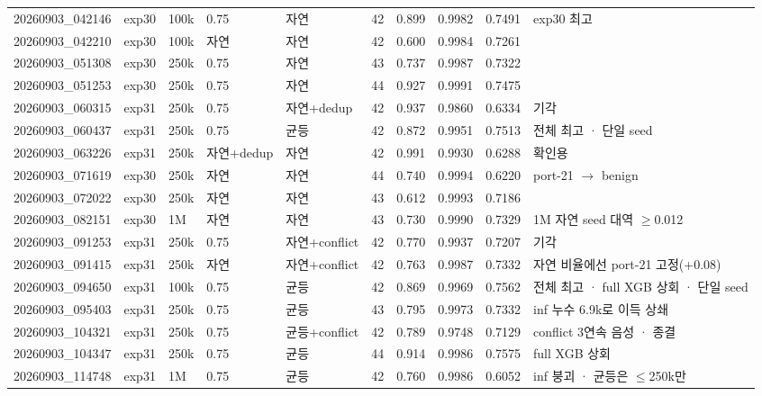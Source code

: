 \begin{landscape}
\begin{longtable}
{}20260903\_\allowbreak{}042146 & exp30 & 100k & 0.75 & 자연 & 42 & 0.899 & 0.9982 & 0.7491 & exp30 최고 \\
{}20260903\_\allowbreak{}042210 & exp30 & 100k & 자연 & 자연 & 42 & 0.600 & 0.9984 & 0.7261 &  \\
{}20260903\_\allowbreak{}051308 & exp30 & 250k & 0.75 & 자연 & 43 & 0.737 & 0.9987 & 0.7322 &  \\
{}20260903\_\allowbreak{}051253 & exp30 & 250k & 0.75 & 자연 & 44 & 0.927 & 0.9991 & 0.7475 &  \\
{}20260903\_\allowbreak{}060315 & exp31 & 250k & 0.75 & 자연+\allowbreak{}dedup & 42 & 0.937 & 0.9860 & 0.6334 & 기각 \\
{}20260903\_\allowbreak{}060437 & exp31 & 250k & 0.75 & 균등 & 42 & 0.872 & 0.9951 & 0.7513 & 전체 최고 · 단일 seed \\
{}20260903\_\allowbreak{}063226 & exp31 & 250k & 자연+\allowbreak{}dedup & 자연 & 42 & 0.991 & 0.9930 & 0.6288 & 확인용 \\
{}20260903\_\allowbreak{}071619 & exp30 & 250k & 자연 & 자연 & 44 & 0.740 & 0.9994 & 0.6220 & port-21 \ensuremath{\rightarrow} benign \\
{}20260903\_\allowbreak{}072022 & exp30 & 250k & 자연 & 자연 & 43 & 0.612 & 0.9993 & 0.7186 &  \\
{}20260903\_\allowbreak{}082151 & exp30 & 1M & 자연 & 자연 & 43 & 0.730 & 0.9990 & 0.7329 & 1M 자연 seed 대역 \ensuremath{\geq}0.012 \\
{}20260903\_\allowbreak{}091253 & exp31 & 250k & 0.75 & 자연+\allowbreak{}conflict & 42 & 0.770 & 0.9937 & 0.7207 & 기각 \\
{}20260903\_\allowbreak{}091415 & exp31 & 250k & 자연 & 자연+\allowbreak{}conflict & 42 & 0.763 & 0.9987 & 0.7332 & 자연 비율에선 port-21 고정(+\allowbreak{}0.08) \\
{}20260903\_\allowbreak{}094650 & exp31 & 100k & 0.75 & 균등 & 42 & 0.869 & 0.9969 & 0.7562 & 전체 최고 · full XGB 상회 · 단일 seed \\
{}20260903\_\allowbreak{}095403 & exp31 & 250k & 0.75 & 균등 & 43 & 0.795 & 0.9973 & 0.7332 & inf 누수 6.9k로 이득 상쇄 \\
{}20260903\_\allowbreak{}104321 & exp31 & 250k & 0.75 & 균등+\allowbreak{}conflict & 42 & 0.789 & 0.9748 & 0.7129 & conflict 3연속 음성 · 종결 \\
{}20260903\_\allowbreak{}104347 & exp31 & 250k & 0.75 & 균등 & 44 & 0.914 & 0.9986 & 0.7575 & full XGB 상회 \\
{}20260903\_\allowbreak{}114748 & exp31 & 1M & 0.75 & 균등 & 42 & 0.760 & 0.9986 & 0.6052 & inf 붕괴 · 균등은 \ensuremath{\leq}250k만 \\

\end{longtable}
\end{landscape}
